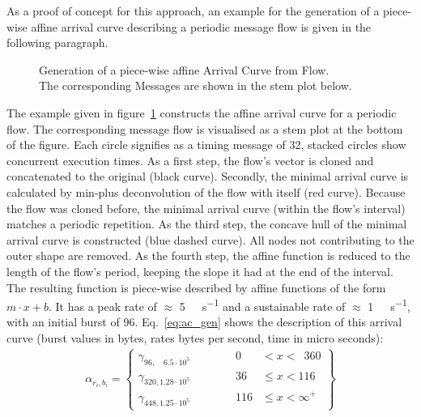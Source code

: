 As a proof of concept for this approach, an example for the generation of a piece-wise affine arrival curve
describing a periodic message flow is given in the following paragraph.
%
\begin{figure}[H]

\caption{Generation of a piece-wise affine Arrival Curve from Flow.\\The corresponding Messages are shown in the stem plot below.}
  \label{fig:arrival}
\end{figure}
%
The example given in figure~\ref{fig:arrival} constructs the affine arrival curve for a periodic flow.
The corresponding message flow is visualised as a stem plot at the bottom of the figure. Each circle signifies as a timing message of \SI{32}{\byte}, stacked circles show concurrent execution times.
As a first step, the flow's vector is cloned and concatenated to the original (black curve). Secondly, the minimal arrival curve is calculated by min-plus deconvolution of the flow with itself (red curve). Because the flow was cloned before, the minimal arrival curve (within the flow's interval) matches a periodic repetition. As the third step, the concave hull of the minimal arrival curve is constructed (blue dashed curve).
All nodes not contributing to the outer shape are removed. As the fourth step, the affine function is reduced to the length of the flow's period, keeping the slope it had at the end of the interval.
The resulting function is piece-wise described by affine functions of the form $m\cdot x + b$. It has a peak rate of $\approx$ \SI{5}{\mega\bit\per\second} and a sustainable rate of $\approx$ \SI{1}{\mega\bit\per\second}, with an initial burst of \SI{96}{\byte}.
Eq.~\ref{eq:ac_gen} shows the description of this arrival curve (burst values in bytes, rates bytes per second, time in micro seconds):
\begin{align}
\label{eq:ac_gen}
\alpha_{r_i, b_i} = \left\{
\begin{array}{lcrl}
\gamma_{96,\phantom{0} \phantom{1}6.5 \cdot 10^{5}}  & \hspace{1cm} & 0 & < x < \phantom{1}360 \\
\gamma_{320, 1.28 \cdot 10^{5}} & \hspace{1cm} & 36  & \le x < 116 \\
\gamma_{448, 1.25 \cdot 10^{5}} & \hspace{1cm} & 116 & \le x < \infty^+
\end{array}
\right\}
\end{align}

